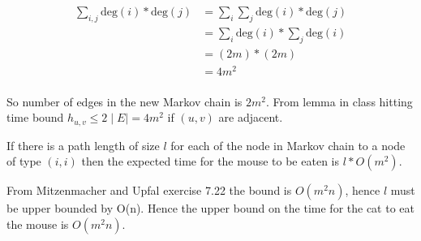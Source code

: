 \documentclass[addpoints,12pt]{exam}
\begin{document}
\begin{questions}
\begin{solution}
            \begin{align*}
                \displaystyle\sum_{i, j}\mathrm{deg}(i) * \mathrm{deg}(j) &= \displaystyle\sum_{i} \displaystyle\sum_{j}\mathrm{deg}(i) * \mathrm{deg}(j)\\
                &= \displaystyle\sum_{i} \mathrm{deg}(i) * \displaystyle\sum_{j} \mathrm{deg}(i)\\
                &= (2m) * (2m)\\
                &= 4m^2\\
            \end{align*}

            So number of edges in the new Markov chain is $2m^2$. From lemma in class hitting time bound $h_{u,v} \leq 2 \mid E\mid = 4m^2$ if $(u, v)$ are adjacent.

            If there is a path length of size $l$ for each of the node in Markov chain to a node of type $(i, i)$ then the expected time for the mouse to be eaten is $l * O(m^2)$.

            From Mitzenmacher and Upfal exercise 7.22 the bound is $O(m^2 n)$, hence $l$ must be upper bounded by O(n). Hence the upper bound on the time for the cat to eat the mouse is $O(m^2 n)$.
		\end{solution}
	\end{questions}
\end{document}

